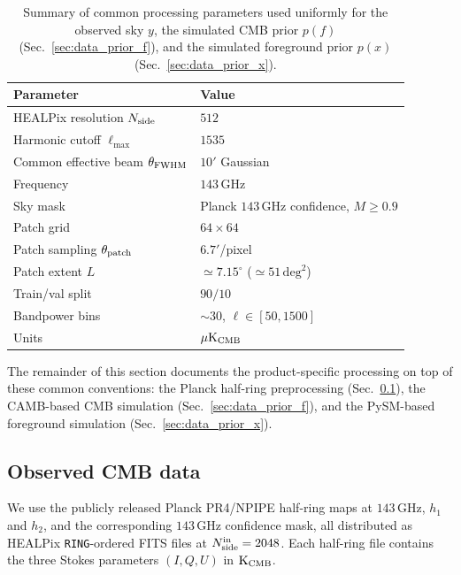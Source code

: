 \documentclass[11pt]{article}
\theoremstyle{definition}
\begin{document}
\begin{table}[h]
  \centering
  \begin{tabular}{ll}
    \toprule
    Parameter & Value \\
    \midrule
    HEALPix resolution $N_{\rm side}$ & $512$ \\
    Harmonic cutoff $\ell_{\max}$ & $1535$ \\
    Common effective beam $\theta_{\rm FWHM}$ & $10'$ Gaussian \\
    Frequency & $143\,\mathrm{GHz}$ \\
    Sky mask & Planck $143\,\mathrm{GHz}$ confidence, $M\geq 0.9$ \\
    Patch grid & $64\times 64$ \\
    Patch sampling $\theta_{\rm patch}$ & $6.7'$/pixel \\
    Patch extent $L$ & $\simeq 7.15^\circ$ ($\simeq 51\,\mathrm{deg}^2$) \\
    Train/val split & $90/10$ \\
    Bandpower bins & $\sim 30$, $\ell\in[50,1500]$ \\
    Units & $\mu\mathrm{K}_{\rm CMB}$ \\
    \bottomrule
  \end{tabular}
  \caption{Summary of common processing parameters used uniformly for the observed sky $y$, the simulated CMB prior $p(f)$ (Sec.~\ref{sec:data_prior_f}), and the simulated foreground prior $p(x)$ (Sec.~\ref{sec:data_prior_x}).}
  \label{tab:processing_params}
\end{table}

The remainder of this section documents the product-specific processing on top of these common conventions: the Planck half-ring preprocessing (Sec.~\ref{sec:data_obs}), the CAMB-based CMB simulation (Sec.~\ref{sec:data_prior_f}), and the PySM-based foreground simulation (Sec.~\ref{sec:data_prior_x}).

\subsection{Observed CMB data}
\label{sec:data_obs}

We use the publicly released Planck PR4/NPIPE \cite{planck2018overview} half-ring maps at $143\,\mathrm{GHz}$, $h_1$ and $h_2$, and the corresponding $143\,\mathrm{GHz}$ confidence mask, all distributed as HEALPix \texttt{RING}-ordered FITS files at $N_{\rm side}^{\rm in}=2048$. Each half-ring file contains the three Stokes parameters $(I,Q,U)$ in $\mathrm{K}_{\rm CMB}$.
\end{document}
